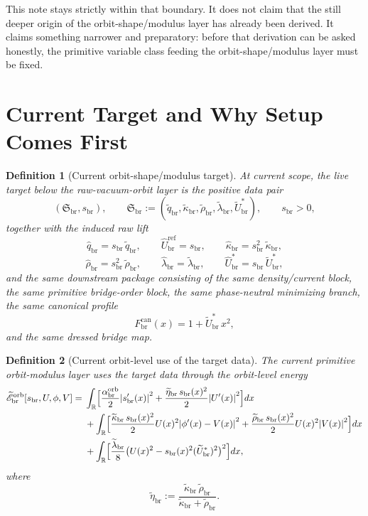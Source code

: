 \documentclass[11pt]{article}
\newcommand{\RespShapeReadout}{\widetilde q_{\mathrm{br}}}
\newcommand{\RespShapeCov}{\widetilde\kappa_{\mathrm{br}}}
\newcommand{\RespShapeRelax}{\widetilde\rho_{\mathrm{br}}}
\newcommand{\RespShapeWell}{\widetilde\lambda_{\mathrm{br}}}
\newcommand{\RespShapeEq}{\widetilde U_{\mathrm{br}}^{\ast}}
\newcommand{\RespShapeIso}{\widetilde\eta_{\mathrm{br}}}
\newcommand{\RespRawReadout}{\widehat q_{\mathrm{br}}}
\newcommand{\RespRawRef}{\widehat U_{\mathrm{br}}^{\mathrm{ref}}}
\newcommand{\RespRawCov}{\widehat\kappa_{\mathrm{br}}}
\newcommand{\RespRawRelax}{\widehat\rho_{\mathrm{br}}}
\newcommand{\RespRawWell}{\widehat\lambda_{\mathrm{br}}}
\newcommand{\RespRawEq}{\widehat U_{\mathrm{br}}^{\ast}}
\newcommand{\CurvProfileCan}{F_{\mathrm{br}}^{\mathrm{can}}}
\newcommand{\ShapeTuple}{\mathfrak S_{\mathrm{br}}}
\newcommand{\ScaleMod}{s_{\mathrm{br}}}
\newcommand{\RespOrbitGrad}{\alpha_{\mathrm{br}}^{\mathrm{orb}}}
\newcommand{\RespOrbitEnergy}{\widetilde{\mathscr E}_{\mathrm{br}}^{\mathrm{orb}}}
\newtheorem{definition}{Definition}
\begin{document}
This note stays strictly within that boundary. It does not claim that the still deeper origin of the orbit-shape/modulus layer has already been derived. It claims something narrower and preparatory: before that derivation can be asked honestly, the primitive variable class feeding the orbit-shape/modulus layer must be fixed.

\section{Current Target and Why Setup Comes First}

\begin{definition}[Current orbit-shape/modulus target]
\label{def:target}
At current scope, the live target below the raw-vacuum-orbit layer is the positive data pair
\begin{equation}
(\ShapeTuple,\ScaleMod),
\qquad
\ShapeTuple
:=
(\RespShapeReadout,\RespShapeCov,\RespShapeRelax,\RespShapeWell,\RespShapeEq),
\qquad
\ScaleMod>0,
\label{eq:target}
\end{equation}
together with the induced raw lift
\begin{equation}
\RespRawReadout=\ScaleMod\,\RespShapeReadout,
\qquad
\RespRawRef=\ScaleMod,
\qquad
\RespRawCov=\ScaleMod^2\,\RespShapeCov,
\label{eq:rawliftA}
\end{equation}
\begin{equation}
\RespRawRelax=\ScaleMod^2\,\RespShapeRelax,
\qquad
\RespRawWell=\RespShapeWell,
\qquad
\RespRawEq=\ScaleMod\,\RespShapeEq,
\label{eq:rawliftB}
\end{equation}
and the same downstream package
consisting of the same density/current block, the same primitive bridge-order block, the same phase-neutral minimizing branch, the same canonical profile
\[
\CurvProfileCan(x)=1+\RespShapeEq\,x^2,
\]
and the same dressed bridge map.
\end{definition}

\begin{definition}[Current orbit-level use of the target data]
\label{def:orbituse}
The current primitive orbit-modulus layer uses the target data through the orbit-level energy
\begin{align}
\RespOrbitEnergy[\ScaleMod,U,\phi,V]
=\;&
\int_{\mathbb R}\Bigl[
\frac{\RespOrbitGrad}{2}\abs{\ScaleMod'(x)}^2
+
\frac{\RespShapeIso\,\ScaleMod(x)^2}{2}\abs{U'(x)}^2
\Bigr]dx
\nonumber\\
&+
\int_{\mathbb R}\Bigl[
\frac{\RespShapeCov\,\ScaleMod(x)^2}{2}U(x)^2\abs{\phi'(x)-V(x)}^2
+
\frac{\RespShapeRelax\,\ScaleMod(x)^2}{2}U(x)^2\abs{V(x)}^2
\Bigr]dx
\nonumber\\
&+
\int_{\mathbb R}\Bigl[
\frac{\RespShapeWell}{8}\bigl(U(x)^2-\ScaleMod(x)^2(\RespShapeEq)^2\bigr)^2
\Bigr]dx,
\label{eq:orbitenergy}
\end{align}
where
\begin{equation}
\RespShapeIso
:=
\frac{\RespShapeCov\,\RespShapeRelax}{\RespShapeCov+\RespShapeRelax}.
\label{eq:shapeiso}
\end{equation}
\end{definition}
\end{document}
